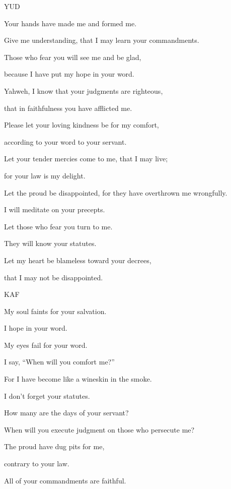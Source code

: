 {\par }{\D YUD
\par }{\Q {}Your hands have made me and formed me.
\par }{\QB Give me understanding, that I may learn your commandments.
\par }{\Q {}Those who fear you will see me and be glad,
\par }{\QB because I have put my hope in your word.
\par }{\Q {}Yahweh, I know that your judgments are righteous,
\par }{\QB that in faithfulness you have afflicted me.
\par }{\Q {}Please let your loving kindness be for my comfort,
\par }{\QB according to your word to your servant.
\par }{\Q {}Let your tender mercies come to me, that I may live;
\par }{\QB for your law is my delight.
\par }{\Q {}Let the proud be disappointed, for they have overthrown me wrongfully.
\par }{\QB I will meditate on your precepts.
\par }{\Q {}Let those who fear you turn to me.
\par }{\QB They will know your statutes.
\par }{\Q {}Let my heart be blameless toward your decrees,
\par }{\QB that I may not be disappointed.
\par }{\D KAF
\par }{\Q {}My soul faints for your salvation.
\par }{\QB I hope in your word.
\par }{\Q {}My eyes fail for your word.
\par }{\QB I say, “When will you comfort me?”
\par }{\Q {}For I have become like a wineskin in the smoke.
\par }{\QB I don’t forget your statutes.
\par }{\Q {}How many are the days of your servant?
\par }{\QB When will you execute judgment on those who persecute me?
\par }{\Q {}The proud have dug pits for me,
\par }{\QB contrary to your law.
\par }{\Q {}All of your commandments are faithful.
}
